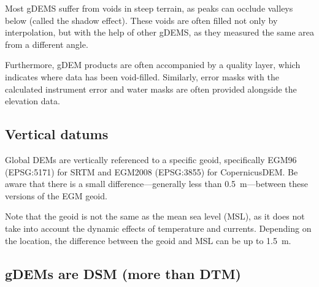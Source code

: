 %

Most gDEMS suffer from voids in steep terrain, as peaks can occlude valleys below (called the shadow effect).
These voids are often filled not only by interpolation, but with the help of other gDEMS, as they measured the same area from a different angle.

%

Furthermore, gDEM products are often accompanied by a quality layer, which indicates where data has been void-filled.
Similarly, error masks with the calculated instrument error and water masks are often provided alongside the elevation data.





\subsection{Vertical datums}

Global DEMs are vertically referenced to a specific geoid, specifically EGM96 (EPSG:5171) for SRTM and EGM2008 (EPSG:3855) for CopernicusDEM\@.%
Be aware that there is a small difference---generally less than \qty{0.5}{m}---between these versions of the EGM geoid.

Note that the geoid is not the same as the mean sea level (MSL),%
as it does not take into account the dynamic effects of temperature and currents.
Depending on the location, the difference between the geoid and MSL can be up to \qty{1.5}{m}.


\subsection{gDEMs are DSM (more than DTM)}

